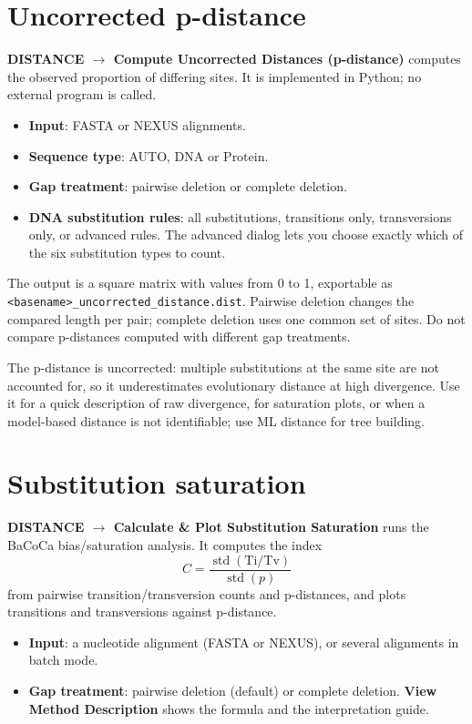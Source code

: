 \documentclass[10pt]{report}
\begin{document}
\section{Uncorrected p-distance}

\textbf{DISTANCE $\rightarrow$ Compute Uncorrected Distances (p-distance)}
computes the observed proportion of differing sites. It is implemented in
Python; no external program is called.

\begin{itemize}
  \item \textbf{Input}: FASTA or NEXUS alignments.
  \item \textbf{Sequence type}: AUTO, DNA or Protein.
  \item \textbf{Gap treatment}: pairwise deletion or complete deletion.
  \item \textbf{DNA substitution rules}: all substitutions, transitions only,
        transversions only, or advanced rules. The advanced dialog lets you
        choose exactly which of the six substitution types to count.
\end{itemize}

The output is a square matrix with values from 0 to 1, exportable as
\texttt{<basename>\_uncorrected\_distance.dist}. Pairwise deletion changes the
compared length per pair; complete deletion uses one common set of sites.
Do not compare p-distances computed with different gap treatments.

The p-distance is uncorrected: multiple substitutions at the same site are not
accounted for, so it underestimates evolutionary distance at high divergence.
Use it for a quick description of raw divergence, for saturation plots, or when
a model-based distance is not identifiable; use ML distance for tree building.

\section{Substitution saturation}

\textbf{DISTANCE $\rightarrow$ Calculate \& Plot Substitution Saturation} runs
the BaCoCa bias/saturation analysis. It computes the index
\[
C = \frac{\operatorname{std}(\mathrm{Ti/Tv})}{\operatorname{std}(p)}
\]
from pairwise transition/transversion counts and p-distances, and plots
transitions and transversions against p-distance.

\begin{itemize}
  \item \textbf{Input}: a nucleotide alignment (FASTA or NEXUS), or several
        alignments in batch mode.
  \item \textbf{Gap treatment}: pairwise deletion (default) or complete
        deletion. \textbf{View Method Description} shows the formula and the
        interpretation guide.
\end{itemize}
\end{document}
